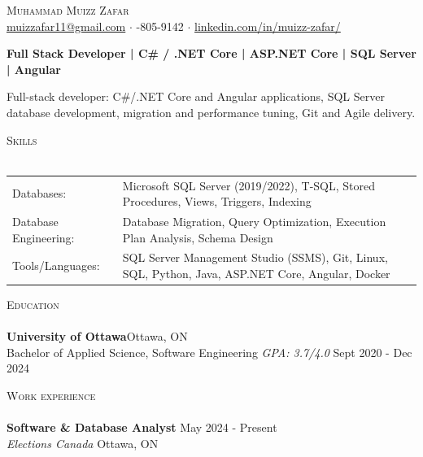 \documentclass[a4paper]{article}
\newcommand{\lineunder} {
    \vspace*{-8pt} \\
    \hspace*{-18pt} \hrulefill \\
}
\newcommand{\header} [1] {
    {\hspace*{-18pt}\vspace*{6pt} \textsc{#1}}
    \vspace*{-6pt} \lineunder
}
\begin{document}
\vspace*{-40pt}
\vspace*{-10pt}
\begin{center}
	{\Huge \scshape {Muhammad Muizz Zafar}}\\
	\faSend \space \href{mailto:muizzafar11@gmail.com}{muizzafar11@gmail.com} $\cdot$ \faPhoneSquare {}-805-9142 $\cdot$ \faLinkedinSquare \space \href{https://www.linkedin.com/in/muizz-zafar/}{linkedin.com/in/muizz-zafar/}
	\\
\end{center}
\vspace{-5pt}
\begin{center}
\textbf{Full Stack Developer | C\# / .NET Core | ASP.NET Core | SQL Server | Angular}
\end{center}
\begin{center}
Full-stack developer: C\#/.NET Core and Angular applications, SQL Server database development, migration and performance tuning, Git and Agile delivery.
\end{center}
\header{Skills}
\begin{tabular}{ l l }
Databases: & Microsoft SQL Server (2019/2022), T-SQL, Stored Procedures, Views, Triggers, Indexing \\
Database Engineering: & Database Migration, Query Optimization, Execution Plan Analysis, Schema Design \\
Tools/Languages: & SQL Server Management Studio (SSMS), Git, Linux, SQL, Python, Java, ASP.NET Core, Angular, Docker \\
\end{tabular}
\vspace{2mm}
\header{Education}
\textbf{University of Ottawa}\hfill Ottawa, ON\\
Bachelor of Applied Science, Software Engineering \textit{GPA: 3.7/4.0} \hfill Sept 2020 - Dec 2024\\
\vspace{2mm}
\header{Work experience}
\vspace{1.5mm}
\textbf{Software \& Database Analyst} \hfill May 2024 - Present\\
\textit{Elections Canada} \hfill Ottawa, ON\\
\vspace{-2mm}
\end{document}
